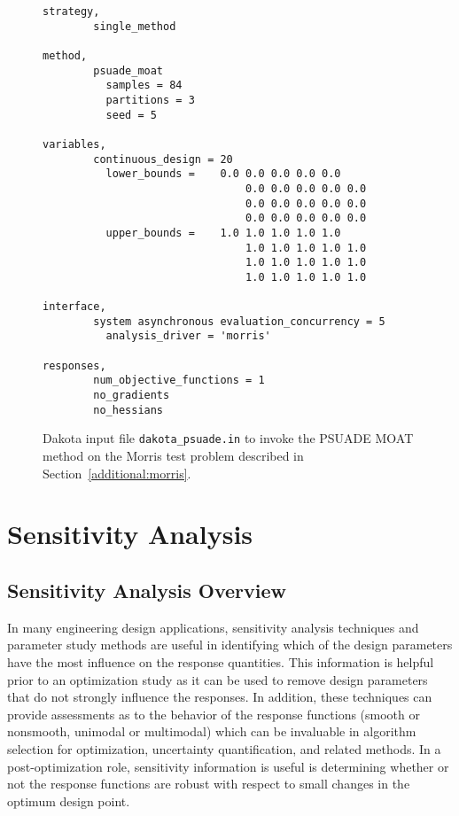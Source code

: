 \begin{figure}[ht!]
\centering
\begin{bigbox}
\begin{small}
\begin{verbatim}
strategy,
        single_method

method,
        psuade_moat
          samples = 84
          partitions = 3
          seed = 5

variables,
        continuous_design = 20
          lower_bounds =    0.0 0.0 0.0 0.0 0.0
                                0.0 0.0 0.0 0.0 0.0
                                0.0 0.0 0.0 0.0 0.0
                                0.0 0.0 0.0 0.0 0.0
          upper_bounds =    1.0 1.0 1.0 1.0 1.0
                                1.0 1.0 1.0 1.0 1.0
                                1.0 1.0 1.0 1.0 1.0
                                1.0 1.0 1.0 1.0 1.0

interface,
        system asynchronous evaluation_concurrency = 5
          analysis_driver = 'morris'

responses,
        num_objective_functions = 1
        no_gradients
        no_hessians
\end{verbatim}
\end{small}
\end{bigbox}
\caption[Dakota input file for PSUADE
MOAT.]{\label{FIG:moat_input}Dakota input file {\tt dakota\_psuade.in}
to invoke the PSUADE MOAT method on the Morris test problem described in
Section~\ref{additional:morris}.}
\end{figure}


\section{Sensitivity Analysis}\label{dace:sa}

\subsection{Sensitivity Analysis Overview}\label{dace:sa:overview}

In many engineering design applications, sensitivity analysis
techniques and parameter study methods are useful in identifying which
of the design parameters have the most influence on the response
quantities. This information is helpful prior to an optimization study
as it can be used to remove design parameters that do not strongly
influence the responses. In addition, these techniques can provide
assessments as to the behavior of the response functions (smooth or
nonsmooth, unimodal or multimodal) which can be invaluable in
algorithm selection for optimization, uncertainty quantification, and
related methods. In a post-optimization role, sensitivity information
is useful is determining whether or not the response functions are
robust with respect to small changes in the optimum design point.

